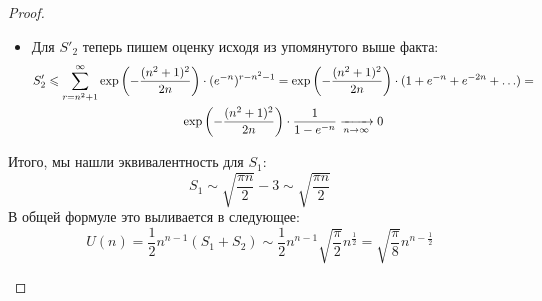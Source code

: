 \begin{proof}
\begin{itemize}
\begin{itemize}
			\item Для $S'_2$ теперь пишем оценку исходя из упомянутого выше факта:
			\begin{multline*}
				S'_2 \leqslant \sum_{r = n^2 + 1}^\infty \exp\left( -\frac{(n^2 + 1)^2}{2n} \right) \cdot (e^{-n})^{r - n^2 - 1} = \exp\left( -\frac{(n^2 + 1)^2}{2n} \right) \cdot (1 + e^{-n} + e^{-2n} + \ldots) =
				\\
				\exp\left( -\frac{(n^2 + 1)^2}{2n} \right) \cdot \frac{1}{1 - e^{-n}} \xrightarrow[n \to \infty]{} 0
			\end{multline*}
		\end{itemize}
		Итого, мы нашли эквивалентность для $S_1$:
		\[
			S_1 \sim \sqrt{\frac{\pi n}{2}} - 3 \sim \sqrt{\frac{\pi n}{2}}
		\]
		В общей формуле это выливается в следующее:
		\[
			U(n) = \frac{1}{2} n^{n - 1} (S_1 + S_2) \sim \frac{1}{2} n^{n - 1} \sqrt{\frac{\pi}{2}} n^{\frac{1}{2}} = \sqrt{\frac{\pi}{8}} n^{n - \frac{1}{2}}
		\]
	\end{itemize}
\end{proof}
